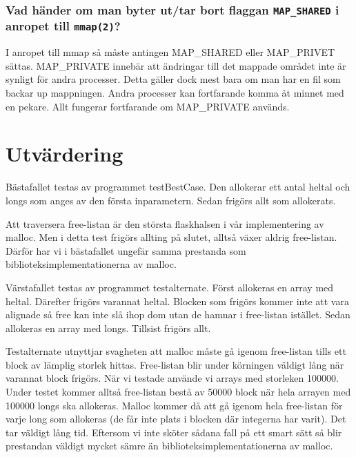 \documentclass[a4paper]{article}
\begin{document}
\subsubsection*{Vad händer om man byter ut/tar bort flaggan \texttt{MAP\_SHARED} i anropet till \texttt{mmap(2)}?} %
I anropet till mmap så måste antingen MAP_SHARED eller MAP_PRIVET sättas. MAP_PRIVATE innebär att ändringar till det mappade området inte är synligt för andra processer. Detta gäller dock mest bara om man har en fil som backar up mappningen. Andra processer kan fortfarande komma åt minnet med en pekare. Allt fungerar fortfarande om MAP_PRIVATE används.

\section*{Utvärdering}
Bästafallet testas av programmet testBestCase. Den allokerar ett antal heltal och longs som anges av den första inparametern. Sedan frigörs allt som allokerats. 

Att traversera free-listan är den största flaskhalsen i vår implementering av malloc. Men i detta test frigörs allting på slutet, alltså växer aldrig free-listan. Därför har vi i bästafallet ungefär samma prestanda som biblioteksimplementationerna av malloc.

Värstafallet testas av programmet testalternate. Först allokeras en array med heltal. Därefter frigörs varannat heltal. Blocken som frigörs kommer inte att vara alignade så free kan inte slå ihop dom utan de hamnar i free-listan istället. Sedan allokeras en array med longs. Tillsist frigörs allt.

Testalternate utnyttjar svagheten att malloc måste gå igenom free-listan tills ett block av lämplig storlek hittas. Free-listan blir under körningen väldigt lång när varannat block frigörs. När vi testade använde vi arrays med storleken 100000. Under testet kommer alltså free-listan bestå av 50000 block när hela arrayen med 100000 longs ska allokeras. Malloc kommer då att gå igenom hela free-listan för varje long som allokeras (de får inte plats i blocken där integerna har varit). Det tar väldigt lång tid. Eftersom vi inte sköter sådana fall på ett smart sätt så blir prestandan väldigt mycket sämre än biblioteksimplementationerna av malloc. 



\end{document}
